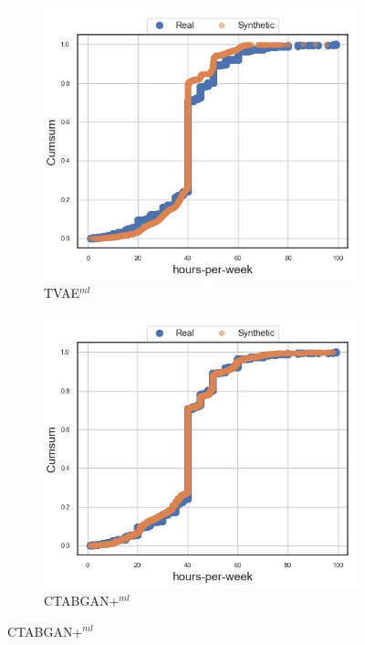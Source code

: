\begin{figure}[H]
	\centering
	\begin{subfigure}{0.3\textwidth}
		\centering
		\includegraphics[width=\textwidth]{images/cdf_hpw/tvae.jpg}
		\caption{TVAE$^{ml}$}
	\end{subfigure}
	\begin{subfigure}{0.3\textwidth}
		\centering
		\includegraphics[width=\textwidth]{images/cdf_hpw/ctabgan+.jpg}
		\caption{CTABGAN+$^{ml}$}

\end{subfigure}
\end{figure}
